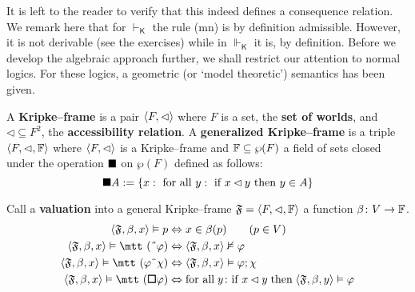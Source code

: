 It is left to the reader to verify that this indeed defines a
consequence relation. We remark here that for $\vdash_{\mathsf{K}}$
the rule (mn) is by definition admissible. However, it is not 
derivable (see the exercises) while in $\Vdash_{\mathsf{K}}$
it is, by definition. Before we develop the algebraic approach 
further, we shall restrict our attention to normal logics. For 
these logics, a geometric (or `model theoretic') semantics has 
been given.
\begin{defn}
A \textbf{Kripke--frame} is a pair $\langle F, \lhd\rangle$ where $F$ is a
set, the \textbf{set of worlds}, and $\lhd \subseteq F^2$, the
\textbf{accessibility relation}. A \textbf{generalized Kripke--frame}
is a triple $\langle F, \lhd, \mathbb{F}\rangle$ where $\langle F, \lhd\rangle$ is a
Kripke--frame and $\mathbb{F} \subseteq \wp(F)$ a field of sets closed
\index{$\sq$}%
under the operation $\sq$ on $\wp(F)$ defined as follows:
\begin{equation}
\blacksquare A := \{x : \text{ for all }y: \text{ if }x \lhd y \text{ then
    }y \in A\}
\end{equation}
\end{defn}
Call a \textbf{valuation} into a  general Kripke--frame
$\mathfrak{F} = \langle F, \lhd, \mathbb{F}\rangle$ a function $\beta \colon V \rightarrow \mathbb{F}$. 
\begin{equation}
\begin{split}
\auf \GF, \beta, x\zu \vDash p & \Dpf x \in \beta(p)\qquad (p \in V) \\
\auf \GF, \beta, x\zu \vDash \mbox{\mtt (\symbol{5}$\varphi$)}
    & \Dpf
\auf \GF, \beta, x\zu \nvDash \varphi \\
\auf \GF, \beta, x\zu \vDash \mbox{\mtt ($\varphi$\symbol{4}$\chi$)}
    & \Dpf
\auf \GF, \beta, x\zu \vDash \varphi;\chi \\
\auf \GF, \beta, x\zu \vDash \mbox{\mtt ($\boldsymbol{\qu}\varphi$)}
    & \Dpf
\mbox{for all}\;y\colon\mbox{if }x\lhd y\;\mbox{then}\;
\auf \GF, \beta, y\zu \vDash \varphi
\end{split}
\end{equation}
